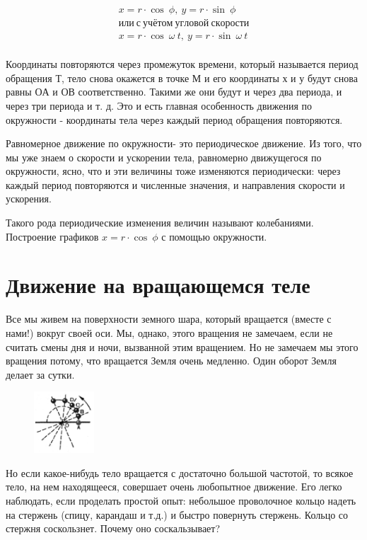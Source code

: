 \documentclass[a6paper, 11pt]{diss_4}
\renewcommand{\'}{\,'}
\begin{document}
\begin{gather*}
x=r\cdot\cos\ \phi,\ y=r\cdot\sin\ \phi\ \\
или\ с\ учётом\ угловой\ скорости\\
x=r\cdot\cos\ \omega\ t,\ y=r\cdot\sin\ \omega\ t \\
\end{gather*}

  Координаты повторяются через промежуток времени, который называется период
обращения $Т$, тело снова окажется в точке $М$ и его координаты $х$ и $у$ будут
 снова равны $ОА$ и $ОВ$ соответственно. Такими же они будут и через два
периода, и через три периода и т. д. Это и есть главная особенность движения
по окружности - координаты тела через каждый период обращения повторяются.

  Равномерное движение по окружности- это периодическое движение. Из
того, что мы уже знаем о скорости и ускорении тела, равномерно движущегося по
окружности, ясно, что и эти величины тоже изменяются периодически: через каждый
период повторяются и численные значения, и направления скорости и ускорения.

  Такого рода периодические изменения величин называют колебаниями.
Построение графиков $x=r\cdot\cos\ \phi$ с помощью окружности.

\section{Движение на вращающемся теле}

  Все мы живем на поверхности земного шара, который вращается (вместе с
нами!) вокруг своей оси. Мы, однако, этого вращения не замечаем, если не
считать смены дня и ночи, вызванной этим вращением. Но не замечаем мы этого
вращения потому, что вращается Земля очень медленно. Один оборот Земля делает
за сутки.

\begin{figure}
\includegraphics[width=0.2\textwidth]{img/img_24.eps}
\caption{}
\label{r65}
\end{figure}
  Но если какое-нибудь тело вращается с достаточно большой частотой, то
всякое тело, на нем находящееся, совершает очень любопытное движение. Его легко
наблюдать, если проделать простой опыт: небольшое проволочное кольцо надеть на
стержень (спицу, карандаш и т.д.) и быстро повернуть стержень. Кольцо со
стержня соскользнет. Почему оно соскальзывает?
\end{document}
